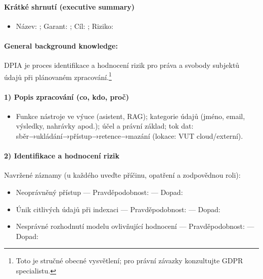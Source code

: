 \paragraph{Krátké shrnutí (executive summary)}
\begin{itemize}
\item Název: \underline{\hspace{8cm}}; Garant: \underline{\hspace{6cm}}; Cíl: \underline{\hspace{6cm}}; Riziko: \underline{\hspace{3cm}}
\end{itemize}
\paragraph{General background knowledge:} DPIA je proces identifikace a hodnocení rizik pro práva a svobody subjektů údajů při plánovaném zpracování.\footnote{Toto je stručné obecné vysvětlení; pro právní závazky konzultujte GDPR specialistu.}
\paragraph{1) Popis zpracování (co, kdo, proč)}
\begin{itemize}
\item Funkce nástroje ve výuce (asistent, RAG); kategorie údajů (jméno, email, výsledky, nahrávky apod.); účel a právní základ; tok dat: sběr→ukládání→přístup→retence→mazání (lokace: VUT cloud/externí).
\end{itemize}
\paragraph{2) Identifikace a hodnocení rizik}
Navržené záznamy (u každého uveďte příčinu, opatření a zodpovědnou roli):
\begin{itemize}
\item Neoprávněný přístup — Pravděpodobnost: \underline{\hspace{2cm}} — Dopad: \underline{\hspace{2cm}}
\item Únik citlivých údajů při indexaci — Pravděpodobnost: \underline{\hspace{2cm}} — Dopad: \underline{\hspace{2cm}}
\item Nesprávné rozhodnutí modelu ovlivňující hodnocení — Pravděpodobnost: \underline{\hspace{2cm}} — Dopad: \underline{\hspace{2cm}}
\end{itemize}
